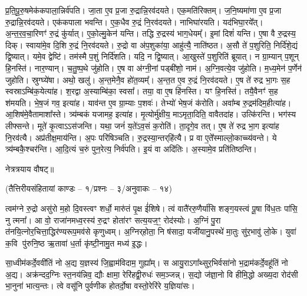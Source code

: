 प्र॒ति॒पू॒रु॒षमेक॑कपाला॒न्निर्व॑पति। जा॒ता ए॒व प्र॒जा रु॒द्रान्नि॒रव॑दयते। एक॒मति॑\-रिक्तम्। ज॒नि॒ष्यमा॑णा ए॒व प्र॒जा रु॒द्रान्नि॒रव॑दयते। एक॑कपाला भवन्ति। ए॒क॒धैव रु॒द्रं नि॒रव॑दयते। नाभिघा॑रयति। यद॑भिघा॒रये᳚त्। अ॒न्त॒र॒व॒चा॒रिणꣳ॑ रु॒द्रं कु॑र्यात्। ए॒को॒ल्मु॒केन॑ यन्ति। 
तद्धि रु॒द्रस्य॑ भाग॒धेयम्᳚। इ॒मां दिशं॑ यन्ति। ए॒षा वै रु॒द्रस्य॒ दिक्। स्वाया॑मे॒व दि॒शि रु॒द्रं नि॒रव॑दयते। रु॒द्रो वा अ॑प॒शुका॑या॒ आहु॑त्यै॒ नाति॑ष्ठत। अ॒सौ ते॑ प॒शुरिति॒ निर्दि॑शे॒द्यं द्वि॒ष्यात्। यमे॒व द्वेष्टि॑। तम॑स्मै प॒शुं निर्दि॑शति। यदि॒ न द्वि॒ष्यात्। आ॒खुस्ते॑ प॒शुरिति॑ ब्रूयात्। 
न ग्रा॒म्यान् प॒शून् हि॒नस्ति॑। नार॒ण्यान्। च॒तु॒ष्प॒थे जु॑होति। ए॒ष वा अ॑ग्नी॒नां पड्बी॑शो॒ नाम॑। अ॒ग्नि॒वत्ये॒व जु॑होति। म॒ध्य॒मेन॑ प॒र्णेन॑ जुहोति। स्रुग्घ्ये॑षा। अथो॒ खलु॑। अ॒न्त॒मेनै॒व हो॑त॒व्यम्᳚। अ॒न्त॒त ए॒व रु॒द्रं नि॒रव॑दयते। 
ए॒ष ते॑ रुद्र भा॒गः स॒ह स्वस्राऽम्बि॑क॒येत्या॑ह। श॒रद्वा अ॒स्याम्बि॑का॒ स्वसा᳚। तया॒ वा ए॒ष हि॑नस्ति। यꣳ हि॒नस्ति॑। तयै॒वैनꣳ॑ स॒ह श॑मयति। भे॒ष॒जं गव॒ इत्या॑ह। याव॑न्त ए॒व ग्रा॒म्याः प॒शवः॑। तेभ्यो॑ भेष॒जं क॑रोति। अवा᳚म्ब रु॒द्रम॑दिम॒हीत्या॑ह। आ॒शिष॑मे॒वैतामाशा᳚स्ते। 
त्र्य॑म्बकं यजामह॒ इत्या॑ह। मृ॒त्योर्मु॑क्षीय॒ माऽमृता॒दिति॒ वावैतदा॑ह। उत्कि॑रन्ति। भग॑स्य लीफ्सन्ते। मूते॑ कृ॒त्वाऽऽस॑जन्ति। यथा॒ जनं॑ य॒ते॑ऽव॒सं क॒रोति॑। ता॒दृगे॒व तत्। ए॒ष ते॑ रुद्र भा॒ग इत्या॑ह नि॒रव॑त्यै। अप्र॑तीक्ष॒माय॑न्ति। अ॒पः परि॑षिञ्चति। \mbox{रु॒द्रस्या॒न्तर्‌\mbox{}हि॑त्यै}। प्र वा ए॒ते᳚स्माल्लो॒काच्च्य॑वन्ते। ये त्र्य॑म्बकै॒श्चर॑न्ति। आ॒दि॒त्यं च॒रुं पुन॒रेत्य॒ निर्व॑पति। इ॒यं वा अदि॑तिः। अ॒स्यामे॒व प्रति॑तिष्ठन्ति। 

नेत्रत्रयाय वौषट्॥

{\small \closesection}



{}
\centerline{\normalsize (तैत्तिरीयसंहितायां काण्डः – १/प्रश्नः – ३/अनुवाकः – १४)}

त्वम॑ग्ने रु॒द्रो असु॑रो म॒हो दि॒वस्त्वꣳ शर्धो॒ मारु॑तं पृ॒क्ष ई॑शिषे। त्वं वातै॑ररु॒णैर्या॑सि शङ्ग॒यस्त्वं पू॒षा वि॑ध॒तः पा॑सि॒ नु त्मना᳚।
आ वो॒ राजा॑नमध्व॒रस्य॑ रु॒द्रꣳ होता॑रꣳ सत्य॒यज॒ꣳ॒ रोद॑स्योः। अ॒ग्निं पु॒रा त॑नयि॒त्नोर॒चित्ता॒द्धिर॑ण्यरूप॒मव॑से कृणुध्वम्। अ॒ग्निर्‌होता॒ नि ष॑सादा॒ यजी॑यानु॒पस्थे॑ मा॒तुः सु॑र॒भावु॑ लो॒के। युवा॑ क॒वि पु॑रुनि॒ष्ठ ऋ॒तावा॑ ध॒र्ता कृ॑ष्टी॒नामु॒त मध्य॑ इ॒द्धः। 

सा॒ध्वीम॑कर्दे॒ववी॑तिं नो अ॒द्य य॒ज्ञस्य॑ जि॒ह्वाम॑विदाम॒ गुह्या᳚म्। स आयु॒रा\-ऽ\-गा᳚थ्सुर॒भिर्वसा॑नो भ॒द्राम॑कर्दे॒वहू॑तिं नो अ॒द्य। अक्र॑न्दद॒ग्निः स्त॒नय॑न्निव॒ द्यौः क्षामा॒ रेरि॑हद्वी॒रुधः॑ सम॒ञ्जन्न्। स॒द्यो ज॑ज्ञा॒नो वि हीमि॒द्धो अख्य॒दा रोद॑सी भा॒नुना॑ भात्य॒न्तः। त्वे वसू॑नि पुर्वणीक होतर्दो॒षा वस्तो॒रेरि॑रे य॒ज्ञिया॑सः। 

